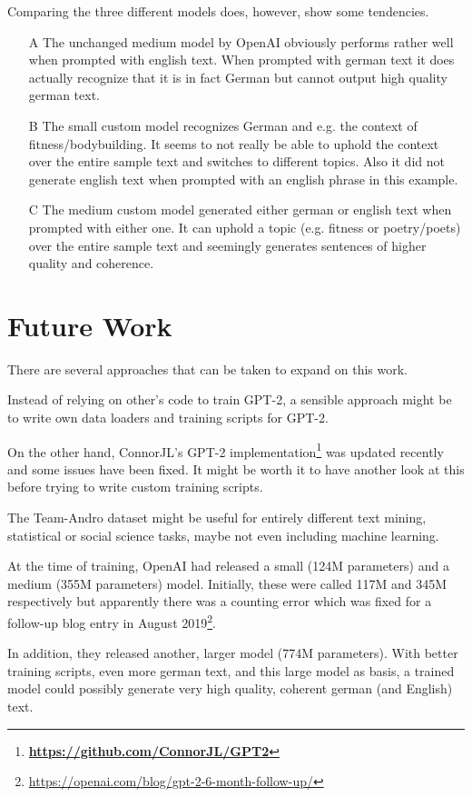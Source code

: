 \documentclass{scrartcl}
\newcommand{\burl}[1]{\textbf{\url{#1}}}
\begin{document}
Comparing the three different models does, however, show some tendencies. 
\begin{itemize}
	\item[A] The unchanged medium model by OpenAI obviously performs rather well when prompted with english text. When prompted with german text it does actually recognize that it is in fact German but cannot output high quality german text.
	\item[B] The small custom model recognizes German and e.g. the context of fitness/bodybuilding. It seems to not really be able to uphold the context over the entire sample text and switches to different topics. Also it did not generate english text when prompted with an english phrase in this example.
	\item[C] The medium custom model generated either german or english text when prompted with either one. It can uphold a topic (e.g. fitness or poetry/poets) over the entire sample text and seemingly generates sentences of higher quality and coherence.
\end{itemize}


\section{Future Work}
\label{sec:FW}
There are several approaches that can be taken to expand on this work.

Instead of relying on other's code to train GPT-2, a sensible approach might be to write own data loaders and training scripts for GPT-2.

On the other hand, ConnorJL's GPT-2 implementation\footnote{\burl{https://github.com/ConnorJL/GPT2}} was updated recently and some issues have been fixed. It might be worth it to have another look at this before trying to write custom training scripts.

The Team-Andro dataset might be useful for entirely different text mining, statistical or social science tasks, maybe not even including machine learning.

At the time of training, OpenAI had released a small (124M parameters) and a medium (355M parameters) model. Initially, these were called 117M and 345M respectively but apparently there was a counting error which was fixed for a follow-up blog entry in August 2019\footnote{\url{https://openai.com/blog/gpt-2-6-month-follow-up/}}.

In addition, they released another, larger model (774M parameters). 
With better training scripts, even more german text, and this large model as basis, a trained model could possibly generate very high quality, coherent german (and English) text.
\end{document}
